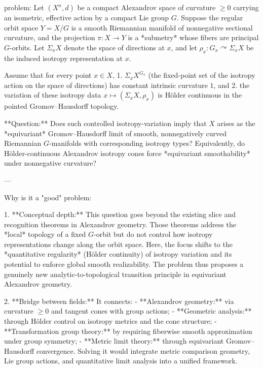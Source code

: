 problem:  
Let \( (X^n, d) \) be a compact Alexandrov space of curvature \(\ge 0\) carrying an isometric, effective action by a compact Lie group \(G\).  
Suppose the regular orbit space \(Y = X/G\) is a smooth Riemannian manifold of nonnegative sectional curvature, and the projection \(\pi : X \to Y\) is a *submetry* whose fibers are principal \(G\)-orbits.  
Let \(\Sigma_x X\) denote the space of directions at \(x\), and let \(\rho_x : G_x \curvearrowright \Sigma_x X\) be the induced isotropy representation at \(x\).

Assume that for every point \(x \in X\),  
1. \( \Sigma_x X^{G_x} \) (the fixed-point set of the isotropy action on the space of directions) has constant intrinsic curvature \(1\), and  
2. the variation of these isotropy data \(x \mapsto (\Sigma_x X, \rho_x)\) is Hölder continuous in the pointed Gromov–Hausdorff topology.  

**Question:**  
Does such controlled isotropy-variation imply that \(X\) arises as the *equivariant* Gromov–Hausdorff limit of smooth, nonnegatively curved Riemannian \(G\)-manifolds with corresponding isotropy types?  
Equivalently, do Hölder-continuous Alexandrov isotropy cones force *equivariant smoothability* under nonnegative curvature?  

---

Why is it a "good" problem:  

1. **Conceptual depth:**  
   This question goes beyond the existing slice and recognition theorems in Alexandrov geometry. Those theorems address the *local* topology of a fixed \(G\)-orbit but do not control how isotropy representations change along the orbit space. Here, the focus shifts to the *quantitative regularity* (Hölder continuity) of isotropy variation and its potential to enforce global smooth realizability. The problem thus proposes a genuinely new analytic-to-topological transition principle in equivariant Alexandrov geometry.

2. **Bridge between fields:**  
   It connects:  
   - **Alexandrov geometry:** via curvature \(\ge0\) and tangent cones with group actions;  
   - **Geometric analysis:** through Hölder control on isotropy metrics and the cone structure;  
   - **Transformation group theory:** by requiring fiberwise smooth approximation under group symmetry;  
   - **Metric limit theory:** through equivariant Gromov–Hausdorff convergence.  
   Solving it would integrate metric comparison geometry, Lie group actions, and quantitative limit analysis into a unified framework.

